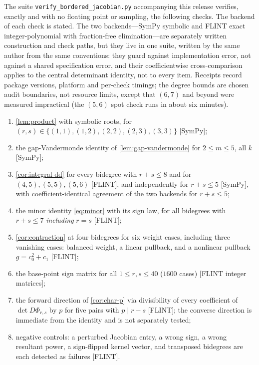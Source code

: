\documentclass[11pt,reqno]{amsart}
\theoremstyle{definition}
\theoremstyle{remark}
\begin{document}
The suite \texttt{verify\_bordered\_jacobian.py} accompanying this
release verifies, exactly and with no floating point or sampling,
the following checks.  The backend of each check is stated.  The two
backends---SymPy symbolic and FLINT exact integer-polynomial with
fraction-free elimination---are separately written construction and
check paths, but they live in one suite, written by the same author
from the same conventions: they guard against implementation error,
not against a shared specification error, and their coefficientwise
cross-comparison applies to the central determinant identity, not to
every item.  Receipts record package versions, platform and
per-check timings; the degree bounds are chosen audit boundaries,
not resource limits, except that $(6,7)$ and beyond were measured
impractical (the $(5,6)$ spot check runs in about six minutes).

\begin{enumerate}[label=(\Roman*),leftmargin=2.6em]
\item[(0)] \cref{lem:product} with symbolic roots, for
$(r,s)\in\{(1,1),(1,2),(2,2),(2,3),(3,3)\}$ [SymPy];
\item[(0$'$)] the gap-Vandermonde identity of
\cref{lem:gap-vandermonde} for $2\le m\le5$, all $k$ [SymPy];
\item \cref{cor:integral-dd} for every bidegree with
$r+s\le8$ and for $(4,5),(5,5),(5,6)$ [FLINT], and independently for
$r+s\le5$ [SymPy], with coefficient-identical agreement of the two
backends for $r+s\le5$;
\item the minor identity \eqref{eq:minor} with its sign law, for all
bidegrees with $r+s\le7$ \emph{including} $r=s$ [FLINT];
\item \cref{cor:contraction} at four bidegrees for six weight cases,
including three vanishing cases: balanced weight, a linear pullback,
and a nonlinear pullback $g=c_0^2+c_1$ [FLINT];
\item the base-point sign matrix for all $1\le r,s\le40$
($1600$ cases) [FLINT integer matrices];
\item the forward direction of \cref{cor:char-p} via divisibility of
every coefficient of $\det D\Phi_{r,s}$ by $p$ for five pairs with
$p\mid r-s$ [FLINT]; the converse direction is immediate from the
identity and is not separately tested;
\item negative controls: a perturbed Jacobian entry, a wrong sign, a
wrong resultant power, a sign-flipped kernel vector, and transposed
bidegrees are each detected as failures [FLINT].
\end{enumerate}
\end{document}

